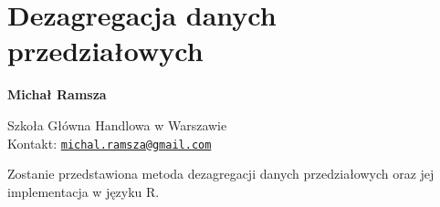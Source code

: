 \documentclass[\main/boa.tex]{subfiles}
\begin{document}
\section{Dezagregacja danych przedziałowych}


\begin{minipage}{0.915\textwidth}
	\centering
  {\bf \huge {} Michał Ramsza}
\end{minipage}


\vskip 0.3cm

\begin{affiliations}
\begin{minipage}{0.915\textwidth}
\centering
\large Szkoła Główna Handlowa w Warszawie \\[5pt]
Kontakt: \href{mailto:michal.ramsza@gmail.com}{\nolinkurl{michal.ramsza@gmail.com}}\\
\end{minipage}
\end{affiliations}

\vskip 0.8cm

Zostanie przedstawiona metoda dezagregacji danych przedziałowych oraz jej implementacja w języku R. 
\end{document}
